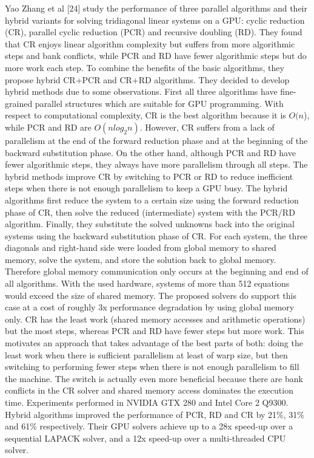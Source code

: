 Yao Zhang et al [24] study the performance of three parallel algorithms and their hybrid variants for solving tridiagonal linear systems on a GPU: cyclic reduction (CR), parallel cyclic reduction (PCR) and recursive doubling (RD). They found that CR enjoys linear algorithm complexity but suffers from more algorithmic steps and bank conflicts, while PCR and RD have fewer algorithmic steps but do more work each step. To combine the benefits of the basic algorithms, they propose hybrid CR+PCR and CR+RD algorithms. They decided to develop hybrid methods due to some observations. First all three algorithms have fine-grained parallel structures which are suitable for GPU programming. With respect to computational complexity, CR is the best algorithm because it is $O(n$), while PCR and RD are $O(nlog_2n)$. However, CR suffers from a lack of parallelism at the end of the forward reduction phase and at the beginning of the backward substitution phase. On the other hand, although PCR and RD have fewer algorithmic steps, they always have more parallelism through all steps. The hybrid methods improve CR by switching to PCR or RD to reduce inefficient steps when there is not enough parallelism to keep a GPU busy. The hybrid algorithms first reduce the system to a certain size using the forward reduction phase of CR, then solve the reduced (intermediate) system with the PCR/RD algorithm. Finally, they substitute the solved unknowns back into the original systems using the backward substitution phase of CR. For each system, the three diagonals and right-hand side were loaded from global memory to shared memory, solve the system, and store the solution back to global memory. Therefore global memory communication only occurs at the beginning and end of all algorithms. With the used hardware, systems of more than 512 equations would exceed the size of shared memory. The proposed solvers do support this case at a cost of roughly 3x performance degradation by using global memory only. CR has the least work (shared memory accesses and arithmetic operations) but the most steps, whereas PCR and RD have fewer steps but more work. This motivates an approach that takes advantage of the best parts of both: doing the least work when there is sufficient parallelism at least of warp size, but then switching to performing fewer steps when there is not enough parallelism to fill the machine. The switch is actually even more beneficial because there are bank conflicts in the CR solver and shared memory access dominates the execution time. Experiments performed in NVIDIA GTX 280 and Intel Core 2 Q9300. Hybrid algorithms improved the performance of PCR, RD and CR by 21\%, 31\% and 61\% respectively. Their GPU solvers achieve up to a 28x speed-up over a sequential LAPACK solver, and a 12x speed-up over a multi-threaded CPU solver.

